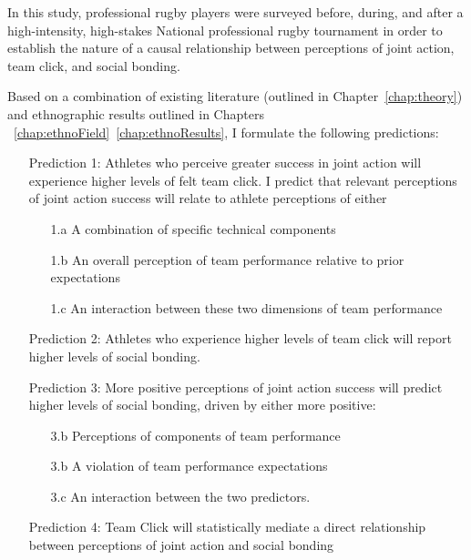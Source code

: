 \begin{CJK}{UTF8}{gbsn}
In this study, professional rugby players were surveyed before, during, and after a high-intensity, high-stakes National professional rugby tournament in order to establish the nature of a causal relationship between perceptions of joint action, team click, and social bonding.

Based on a combination of existing literature (outlined in Chapter~\ref{chap:theory}) and ethnographic results outlined in Chapters ~\ref{chap:ethnoField}\nobreakdash~\ref{chap:ethnoResults}, I formulate the following predictions:

\begin{itemize}
  \item[Prediction 1:] Athletes who perceive greater success in joint action will experience higher levels of felt team click. I predict that relevant perceptions of joint action success will relate to athlete perceptions of either
      \begin{itemize}
        \item[1.a] A combination of specific technical components
        \item[1.b] An overall perception of team performance relative to prior expectations
        \item[1.c] An interaction between these two dimensions of team performance
      \end{itemize}
  \item[Prediction 2:] Athletes who experience higher levels of team click will report higher levels of social bonding.
  \item[Prediction 3:] More positive perceptions of joint action success will predict higher levels of social bonding, driven by either more positive:
    \begin{itemize}
        \item[3.b] Perceptions of components of team performance
    	  \item[3.b] A violation of team performance expectations
        \item[3.c] An interaction between the two predictors.
    \end{itemize}
  \item[Prediction 4:] Team Click will statistically mediate a direct relationship between perceptions of joint action and social bonding
\end{itemize}



\end{CJK}
